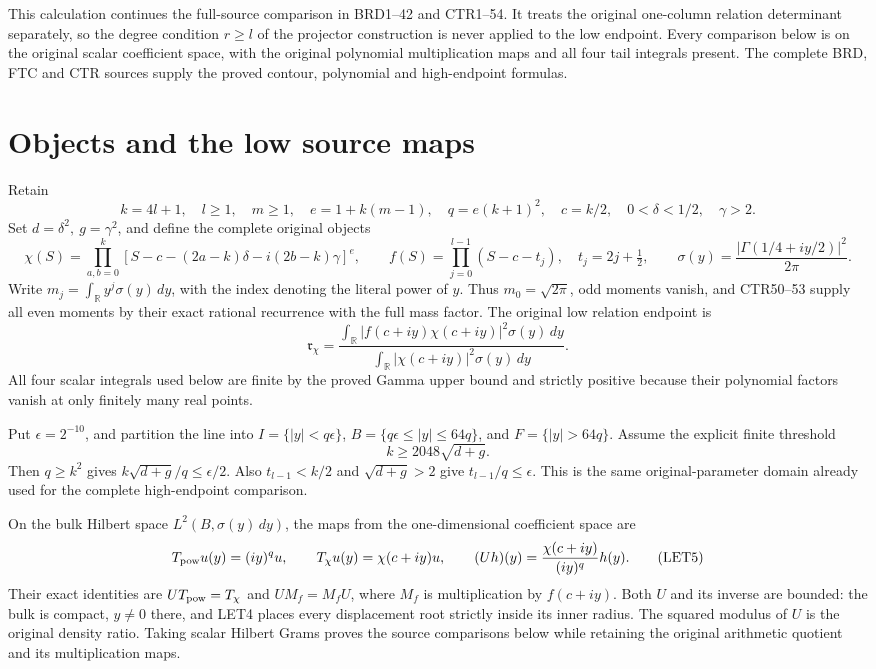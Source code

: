 


This calculation continues the full-source comparison in BRD1--42 and
CTR1--54. It treats the original one-column relation determinant separately,
so the degree condition \(r\ge l\) of the projector construction is never
applied to the low endpoint. Every comparison below is on the original
scalar coefficient space, with the original polynomial multiplication
maps and all four tail integrals present. The complete BRD, FTC and CTR
sources supply the proved contour, polynomial and high-endpoint formulas.

\section{Objects and the low source maps}
Retain
\[
 k=4l+1,\quad l\ge1,\quad m\ge1,\quad e=1+k(m-1),\quad
 q=e(k+1)^2,\quad c=k/2,\quad 0<\delta<1/2,\quad\gamma>2.
 \tag{LET1}
\]
Set \(d=\delta^2,\ g=\gamma^2\), and define the complete original objects
\[
 \chi(S)=\prod_{a,b=0}^k
 [S-c-(2a-k)\delta-i(2b-k)\gamma]^e,\qquad
 f(S)=\prod_{j=0}^{l-1}(S-c-t_j),\quad t_j=2j+\tfrac12,
 \qquad \sigma(y)=\frac{|\Gamma(1/4+iy/2)|^2}{2\pi}.
 \tag{LET2}
\]
Write \(m_j=\int_{\mathbb R}y^j\sigma(y)\,dy\), with the index denoting the
literal power of \(y\). Thus \(m_0=\sqrt{2\pi}\), odd moments vanish, and
CTR50--53 supply all even moments by their exact rational recurrence with
the full mass factor. The original low relation endpoint is
\[
 \mathfrak r_\chi=
 \frac{\int_{\mathbb R}|f(c+iy)\chi(c+iy)|^2\sigma(y)\,dy}
      {\int_{\mathbb R}|\chi(c+iy)|^2\sigma(y)\,dy}.
 \tag{LET3}
\]
All four scalar integrals used below are finite by the proved Gamma upper
bound and strictly positive because their polynomial factors vanish at
only finitely many real points.

Put \(\epsilon=2^{-10}\), and partition the line into
\(I=\{|y|<q\epsilon\}\), \(B=\{q\epsilon\le |y|\le64q\}\), and
\(F=\{|y|>64q\}\). Assume the explicit finite threshold
\[
 k\ge2048\sqrt{d+g}.
 \tag{LET4}
\]
Then \(q\ge k^2\) gives \(k\sqrt{d+g}/q\le\epsilon/2\).
Also \(t_{l-1}<k/2\) and \(\sqrt{d+g}>2\) give
\(t_{l-1}/q\le\epsilon\). This is the same original-parameter domain
already used for the complete high-endpoint comparison.

On the bulk Hilbert space \(L^2(B,\sigma(y)\,dy)\), the maps from the
one-dimensional coefficient space are
\[
 T_{\rm pow}u(y)=(iy)^q u,\qquad
 T_\chi u(y)=\chi(c+iy)u,\qquad
 (Uh)(y)=\frac{\chi(c+iy)}{(iy)^q}h(y).
 \tag{LET5}
\]
Their exact identities are \(UT_{\rm pow}=T_\chi\) and
\(UM_f=M_fU\), where \(M_f\) is multiplication by \(f(c+iy)\).
Both \(U\) and its inverse are bounded: the bulk is compact, \(y\ne0\)
there, and LET4 places every displacement root strictly inside its inner
radius. The squared modulus of \(U\) is the original density ratio.
Taking scalar Hilbert Grams proves the source comparisons below while
retaining the original arithmetic quotient and its multiplication maps.

